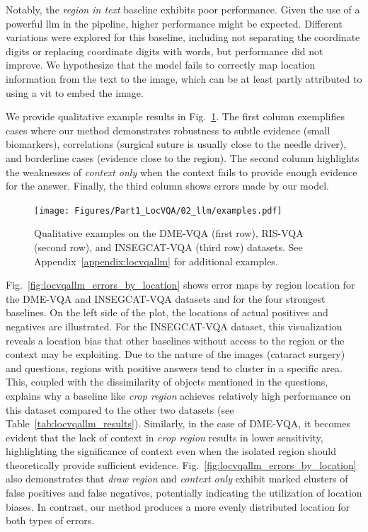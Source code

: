 Notably, the \textit{region in text} baseline exhibits poor performance. Given the use of a powerful \gls{llm} in the pipeline, higher performance might be expected. Different variations were explored for this baseline, including not separating the coordinate digits or replacing coordinate digits with words, but performance did not improve. We hypothesize that the model fails to correctly map location information from the text to the image, which can be at least partly attributed to using a \gls{vit} to embed the image.

We provide qualitative example results in Fig.~\ref{fig:locvqallm_examples}. The first column exemplifies cases where our method demonstrates robustness to subtle evidence (small biomarkers), correlations (surgical suture is usually close to the needle driver), and borderline cases (evidence close to the region). The second column highlights the weaknesses of \textit{context only} when the context fails to provide enough evidence for the answer. Finally, the third column shows errors made by our model.
\begin{figure}[!t]
\begin{center}
\texttt{[image: Figures/Part1\_LocVQA/02\_llm/examples.pdf]}
\caption{Qualitative examples on the DME-VQA (first row), RIS-VQA (second row), and INSEGCAT-VQA (third row) datasets. See Appendix~\ref{appendix:locvqallm} for additional examples.}
\label{fig:locvqallm_examples}
\end{center}
\end{figure}
Fig.~\ref{fig:locvqallm_errors_by_location} shows error maps by region location for the DME-VQA and INSEGCAT-VQA datasets and for the four strongest baselines. On the left side of the plot, the locations of actual positives and negatives are illustrated. For the INSEGCAT-VQA dataset, this visualization reveals a location bias that other baselines without access to the region or the context may be exploiting. Due to the nature of the images (cataract surgery) and questions, regions with positive answers tend to cluster in a specific area. This, coupled with the dissimilarity of objects mentioned in the questions, explains why a baseline like \textit{crop region} achieves relatively high performance on this dataset compared to the other two datasets (see Table~\ref{tab:locvqallm_results}). Similarly, in the case of DME-VQA, it becomes evident that the lack of context in \textit{crop region} results in lower sensitivity, highlighting the significance of context even when the isolated region should theoretically provide sufficient evidence. Fig.~\ref{fig:locvqallm_errors_by_location} also demonstrates that \textit{draw region} and \textit{context only} exhibit marked clusters of false positives and false negatives, potentially indicating the utilization of location biases. In contrast, our method produces a more evenly distributed location for both types of errors.
